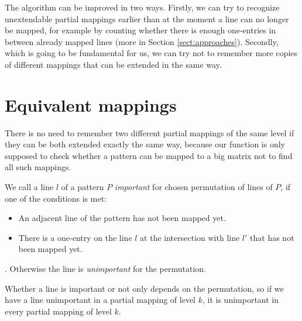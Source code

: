 The algorithm can be improved in two ways. Firstly, we can try to recognize unextendable partial mappings earlier than at the moment a line can no longer be mapped, for example by counting whether there is enough one-entries in between already mapped lines (more in Section \ref{sect:approaches}). Secondly, which is going to be fundamental for us, we can try not to remember more copies of different mappings that can be extended in the same way.

\section{Equivalent mappings}
There is no need to remember two different partial mappings of the same level if they can be both extended exactly the same way, because our function is only supposed to check whether a pattern can be mapped to a big matrix not to find all such mappings.
\begin{defn}
We call a line $l$ of a pattern $P$ \emph{important} for chosen permutation of lines of $P$, if one of the conditions is met:
\begin{itemize}
\item An adjacent line of the pattern has not been mapped yet.
\item There is a one-entry on the line $l$ at the intersection with line $l'$ that has not been mapped yet.
\end{itemize}.
Otherwise the line is \emph{unimportant} for the permutation.
\end{defn}
Whether a line is important or not only depends on the permutation, so if we have a line unimportant in a partial mapping of level $k$, it is unimportant in every partial mapping of level $k$.

